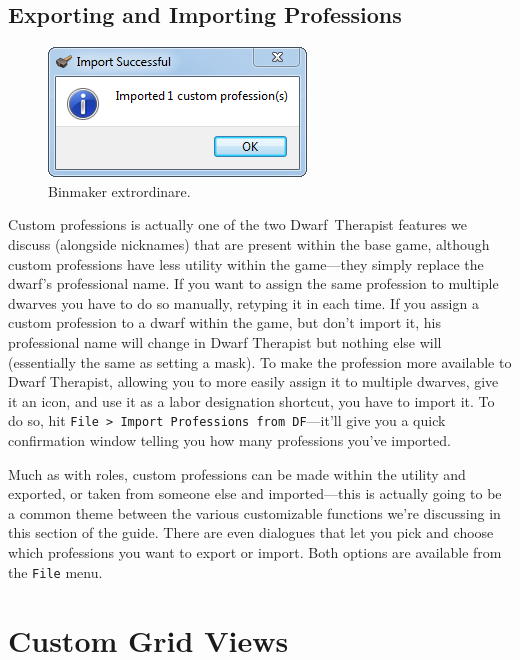\documentclass[]{article}
\begin{document}
\subsection{Exporting and Importing Professions}
\label{sec:Exporting and Importing Professions}
\begin{figure}
\vspace{-20pt}
  \begin{center}
    \includegraphics{Sec3Fig12}
  \end{center}
\vspace{-15pt}
\caption{Binmaker extrordinare.}
\end{figure}
Custom professions is actually one of the two \hbox{Dwarf Therapist} features we discuss (alongside
nicknames) that are present within the base game, although custom professions have less utility within
the game---they simply replace the dwarf's professional name. If you want to assign the same profession
to multiple dwarves you have to do so manually, retyping it in each time. If you assign a custom
profession to a dwarf within the game, but don't import it, his professional name will change in Dwarf
Therapist but nothing else will (essentially the same as setting a mask). To make the profession more
available to Dwarf Therapist, allowing you to more easily assign it to multiple dwarves, give it an icon,
and use it as a labor designation shortcut, you have to import it. To do so, hit \texttt{File > Import
Professions from DF}---it'll give you a quick confirmation window telling you how many professions you've
imported.

Much as with roles, custom professions can be made within the utility and exported, or taken from someone
else and imported---this is actually going to be a common theme between the various customizable
functions we're discussing in this section of the guide. There are even dialogues that let you pick and
choose which professions you want to export or import. Both options are available from the \texttt{File}
menu.

\newpage
\section{Custom Grid Views}
\label{sec:Custom Grid Views}
\end{document}
